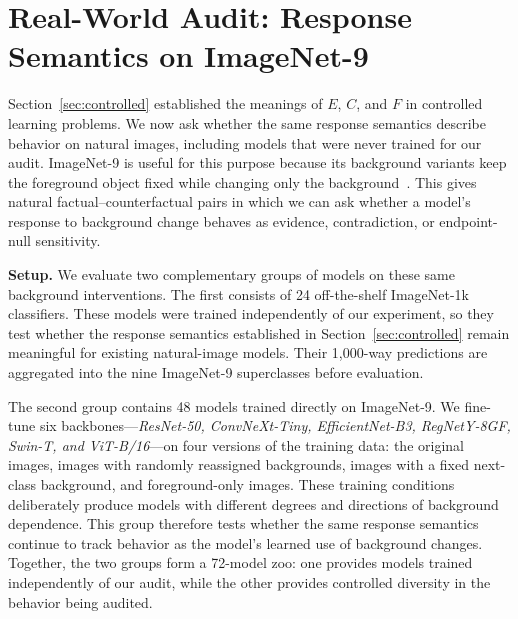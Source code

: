 \section{Real-World Audit: Response Semantics on ImageNet-9}
\label{sec:imagenet9}

Section~\ref{sec:controlled} established the meanings of $E$, $C$, and $F$ in controlled learning problems. We now ask whether the same response semantics describe behavior on natural images, including models that were never trained for our audit. ImageNet-9 is useful for this purpose because its background variants keep the foreground object fixed while changing only the background~\citep{xiao2021noise}. This gives natural factual--counterfactual pairs in which we can ask whether a model's response to background change behaves as evidence, contradiction, or endpoint-null sensitivity.

\textbf{Setup.} We evaluate two complementary groups of models on these same background interventions. The first consists of 24 off-the-shelf ImageNet-1k classifiers. These models were trained independently of our experiment, so they test whether the response semantics established in Section~\ref{sec:controlled} remain meaningful for existing natural-image models. Their 1,000-way predictions are aggregated into the nine ImageNet-9 superclasses before evaluation.

The second group contains 48 models trained directly on ImageNet-9. We fine-tune six backbones---\emph{ResNet-50, ConvNeXt-Tiny, EfficientNet-B3, RegNetY-8GF, Swin-T, and ViT-B/16}---on four versions of the training data: the original images, images with randomly reassigned backgrounds, images with a fixed next-class background, and foreground-only images. These training conditions deliberately produce models with different degrees and directions of background dependence. This group therefore tests whether the same response semantics continue to track behavior as the model's learned use of background changes. Together, the two groups form a 72-model zoo: one provides models trained independently of our audit, while the other provides controlled diversity in the behavior being audited.

